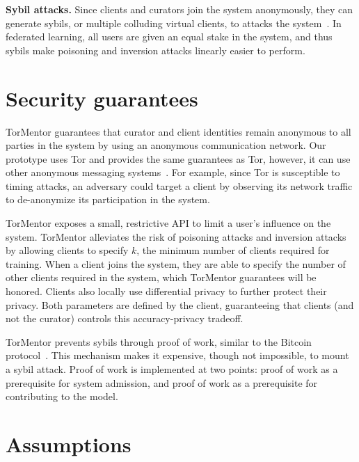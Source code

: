 \textbf{Sybil attacks.}  Since clients and curators join the system
anonymously, they can generate sybils, or multiple colluding virtual
clients, to attacks the system~\cite{Douceur:2002}. In federated
learning, all users are given an equal stake in the system, and
thus sybils make poisoning and inversion attacks linearly easier to
perform.

\section{Security guarantees} 

TorMentor guarantees that curator and client identities remain
anonymous to all parties in the system by using an anonymous
communication network. Our prototype uses Tor and provides the same
guarantees as Tor, however, it can use other anonymous
messaging systems~\cite{Vuvuzela:2015, Riposte:2015}. For example, since
Tor is susceptible to timing attacks, an adversary could target a
client by observing its network traffic to de-anonymize its
participation in the system. 

TorMentor exposes a small, restrictive API to limit a user's influence
on the system. TorMentor alleviates the risk of poisoning attacks and
inversion attacks by allowing clients to specify $k$, the minimum
number of clients required for training. When a client joins the
system, they are able to specify the number of other clients required
in the system, which TorMentor guarantees will be honored. Clients
also locally use differential privacy to further protect their privacy.
Both parameters are defined by the client, guaranteeing that clients (and not
the curator) controls this accuracy-privacy tradeoff.


TorMentor prevents sybils through proof of work, similar to the Bitcoin
protocol~\cite{Nakamoto:2009}. This mechanism makes it expensive,
though not impossible, to mount a sybil attack. Proof of work is
implemented at two points: proof of work as a prerequisite for system
admission, and proof of work as a prerequisite for contributing to the
model.

\section{Assumptions}

